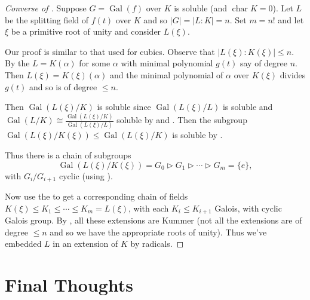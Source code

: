 \documentclass{article}
\DeclareMathOperator{\chara}{char}
\DeclareMathOperator{\Gal}{Gal}
\begin{document}
\begin{proof}[Converse of ]
    Suppose $G = \Gal(f)$ over $K$ is soluble (and $\chara K=0$).
    Let $L$ be the splitting field of $f(t)$ over $K$ and so $|G| = |L:K| = n$.
    Set $m = n!$ and let $\xi$ be a primitive root of unity and consider $L(\xi)$.
    \begin{center}
    \end{center}
    Our proof is similar to that used for cubics.
    Observe that $|L(\xi):K(\xi)| \leq n$. By the  $L=K(\alpha)$ for some $\alpha$ with minimal polynomial $g(t)$ say of degree $n$.
    Then $L(\xi) = K(\xi)(\alpha)$ and the minimal polynomial of $\alpha$ over $K(\xi)$ divides $g(t)$ and so is of degree $\leq n$.

    Then $\Gal(L(\xi)/K)$ is soluble since $\Gal(L(\xi)/L)$ is soluble and $\Gal(L/K) \cong \frac{\Gal(L(\xi)/K)}{\Gal(L(\xi)/L)}$ soluble by  and .
    Then the subgroup $\Gal(L(\xi)/K(\xi)) \leq \Gal(L(\xi)/K)$ is soluble by .

    Thus there is a chain of subgroups
    \begin{equation*}
        \Gal(L(\xi)/K(\xi)) = G_0 \rhd G_1 \rhd \dotsb \rhd G_m = \{e\},
    \end{equation*}
    with $G_i/G_{i+1}$ cyclic (using ).

    Now use the  to get a corresponding chain of fields $K(\xi) \leq K_1 \leq \dotsb \leq K_m = L(\xi)$, with each $K_i \leq K_{i+1}$ Galois, with cyclic Galois group.
    By , all these extensions are Kummer (not all the extensions are of degree $\leq n$ and so we have the appropriate roots of unity).
    Thus we've embedded $L$ in an extension of $K$ by radicals.
\end{proof}

\clearpage
\section{Final Thoughts}
\end{document}
